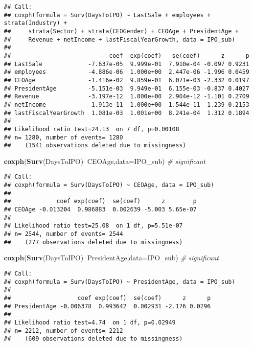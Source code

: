 \documentclass[]{article}
\newenvironment{Shaded}{\begin{snugshade}}{\end{snugshade}}
\newcommand{\CommentTok}[1]{\textcolor[rgb]{0.56,0.35,0.01}{\textit{#1}}}
\newcommand{\DataTypeTok}[1]{\textcolor[rgb]{0.13,0.29,0.53}{#1}}
\newcommand{\KeywordTok}[1]{\textcolor[rgb]{0.13,0.29,0.53}{\textbf{#1}}}
\newcommand{\NormalTok}[1]{#1}
\newcommand{\OperatorTok}[1]{\textcolor[rgb]{0.81,0.36,0.00}{\textbf{#1}}}
\begin{document}
\begin{verbatim}
## Call:
## coxph(formula = Surv(DaysToIPO) ~ LastSale + employees + strata(Industry) + 
##     strata(Sector) + strata(CEOGender) + CEOAge + PresidentAge + 
##     Revenue + netIncome + lastFiscalYearGrowth, data = IPO_sub)
## 
##                            coef  exp(coef)   se(coef)      z      p
## LastSale             -7.637e-05  9.999e-01  7.910e-04 -0.097 0.9231
## employees            -4.886e-06  1.000e+00  2.447e-06 -1.996 0.0459
## CEOAge               -1.416e-02  9.859e-01  6.071e-03 -2.332 0.0197
## PresidentAge         -5.151e-03  9.949e-01  6.155e-03 -0.837 0.4027
## Revenue              -3.197e-12  1.000e+00  2.904e-12 -1.101 0.2709
## netIncome             1.913e-11  1.000e+00  1.544e-11  1.239 0.2153
## lastFiscalYearGrowth  1.081e-03  1.001e+00  8.241e-04  1.312 0.1894
## 
## Likelihood ratio test=24.13  on 7 df, p=0.00108
## n= 1280, number of events= 1280 
##    (1541 observations deleted due to missingness)
\end{verbatim}

\begin{Shaded}
\begin{Highlighting}[]
\KeywordTok{coxph}\NormalTok{(}\KeywordTok{Surv}\NormalTok{(DaysToIPO)}\OperatorTok{~}\NormalTok{CEOAge,}\DataTypeTok{data=}\NormalTok{IPO_sub) }\CommentTok{# significant}
\end{Highlighting}
\end{Shaded}

\begin{verbatim}
## Call:
## coxph(formula = Surv(DaysToIPO) ~ CEOAge, data = IPO_sub)
## 
##             coef exp(coef)  se(coef)      z        p
## CEOAge -0.013204  0.986883  0.002639 -5.003 5.65e-07
## 
## Likelihood ratio test=25.08  on 1 df, p=5.51e-07
## n= 2544, number of events= 2544 
##    (277 observations deleted due to missingness)
\end{verbatim}

\begin{Shaded}
\begin{Highlighting}[]
\KeywordTok{coxph}\NormalTok{(}\KeywordTok{Surv}\NormalTok{(DaysToIPO)}\OperatorTok{~}\NormalTok{PresidentAge,}\DataTypeTok{data=}\NormalTok{IPO_sub) }\CommentTok{# significant}
\end{Highlighting}
\end{Shaded}

\begin{verbatim}
## Call:
## coxph(formula = Surv(DaysToIPO) ~ PresidentAge, data = IPO_sub)
## 
##                   coef exp(coef)  se(coef)      z      p
## PresidentAge -0.006378  0.993642  0.002931 -2.176 0.0296
## 
## Likelihood ratio test=4.74  on 1 df, p=0.02949
## n= 2212, number of events= 2212 
##    (609 observations deleted due to missingness)
\end{verbatim}
\end{document}
